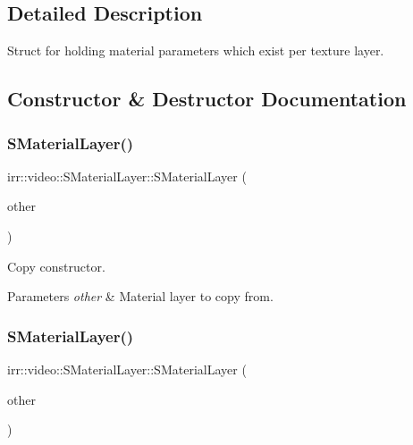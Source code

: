 \subsection{Detailed Description}
Struct for holding material parameters which exist per texture layer. 

\subsection{Constructor \& Destructor Documentation}
\mbox{\label{classirr_1_1video_1_1SMaterialLayer_afb8b8d94178e389f8afa1e6190a35f9d}} 
\subsubsection{\texorpdfstring{S\+Material\+Layer()}{SMaterialLayer()}\hspace{0.1cm}{\footnotesize\ttfamily [1/2]}}
{\footnotesize\ttfamily irr\+::video\+::\+S\+Material\+Layer\+::\+S\+Material\+Layer (\begin{DoxyParamCaption}\item[{const \hyperlink{classirr_1_1video_1_1SMaterialLayer}{S\+Material\+Layer} \&}]{other }\end{DoxyParamCaption})\hspace{0.3cm}{\ttfamily [inline]}}



Copy constructor. 


\begin{DoxyParams}{Parameters}
{\em other} & Material layer to copy from. \\
\hline
\end{DoxyParams}
\mbox{\label{classirr_1_1video_1_1SMaterialLayer_afb8b8d94178e389f8afa1e6190a35f9d}} 
\subsubsection{\texorpdfstring{S\+Material\+Layer()}{SMaterialLayer()}\hspace{0.1cm}{\footnotesize\ttfamily [2/2]}}
{\footnotesize\ttfamily irr\+::video\+::\+S\+Material\+Layer\+::\+S\+Material\+Layer (\begin{DoxyParamCaption}\item[{const \hyperlink{classirr_1_1video_1_1SMaterialLayer}{S\+Material\+Layer} \&}]{other }\end{DoxyParamCaption})\hspace{0.3cm}{\ttfamily [inline]}}



